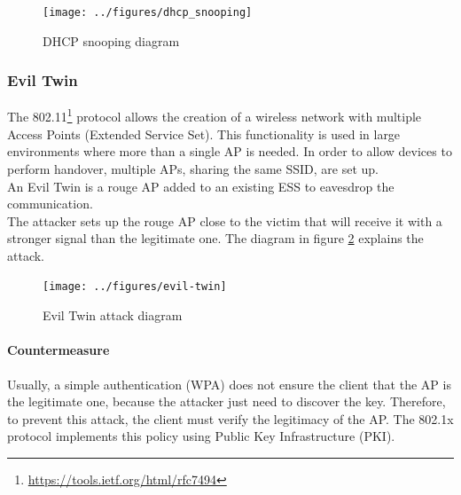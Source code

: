 \documentclass[final]{article}
\begin{document}
\begin{figure}
\center
\texttt{[image: ../figures/dhcp\_snooping]}
\caption{DHCP snooping diagram}
\label{dhcp_snooping}
\end{figure}
\newpage
\subsubsection{Evil Twin}
The 802.11\footnote{\url{https://tools.ietf.org/html/rfc7494}} protocol allows
the creation of a wireless network with multiple Access Points (Extended Service Set).
This functionality is used in large environments where more than a single AP is needed.
In order to allow devices to perform handover, multiple APs, sharing the same \ac{SSID}, are set up. \\
An Evil Twin is a rouge AP added to an existing ESS to eavesdrop the communication.\\
The attacker sets up the rouge AP close to the victim that will receive it with a stronger signal than the legitimate one.
The diagram in figure \ref{evil_twin} explains the attack.
\begin{figure}[h]
  \center
  \texttt{[image: ../figures/evil-twin]}
  \caption{Evil Twin attack diagram}
  \label{evil_twin}
\end{figure}
\paragraph{Countermeasure}
Usually, a simple authentication (WPA) does not ensure the client that the AP is the legitimate one, because the attacker just need to discover the key.
Therefore, to prevent this attack, the client must verify the legitimacy of the AP. The 802.1x protocol implements this policy using Public Key Infrastructure (PKI).
\newpage
\end{document}
